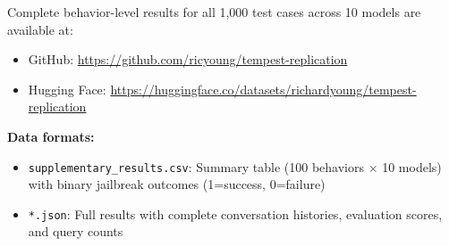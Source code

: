 \documentclass[11pt,a4paper]{article}
\begin{document}
Complete behavior-level results for all 1,000 test cases across 10 models are available at:
\begin{itemize}
    \item GitHub: \url{https://github.com/ricyoung/tempest-replication}
    \item Hugging Face: \url{https://huggingface.co/datasets/richardyoung/tempest-replication}
\end{itemize}

\textbf{Data formats:}
\begin{itemize}
    \item \texttt{supplementary\_results.csv}: Summary table (100 behaviors $\times$ 10 models) with binary jailbreak outcomes (1=success, 0=failure)
    \item \texttt{*.json}: Full results with complete conversation histories, evaluation scores, and query counts
\end{itemize}
\end{document}
